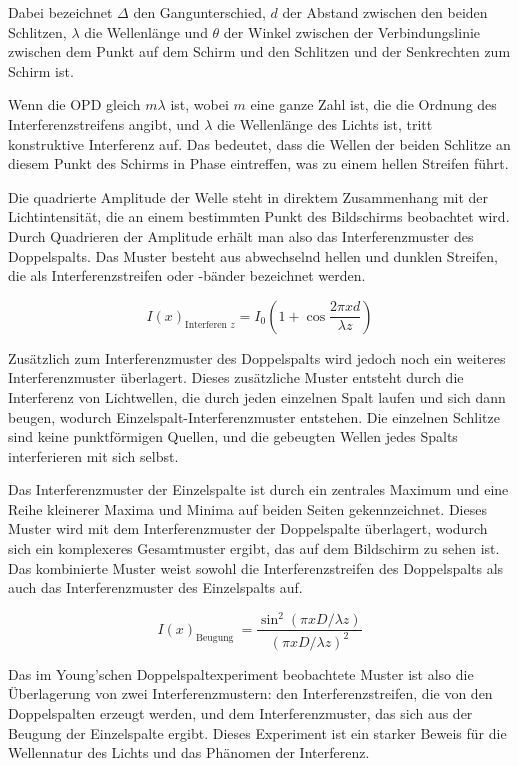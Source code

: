 \documentclass[12pt,english,ngerman]{scrartcl}
\begin{document}

Dabei bezeichnet $\Delta$ den Gangunterschied, $d$ der Abstand zwischen den beiden Schlitzen, $\lambda$ die Wellenlänge
und $\theta$ der Winkel zwischen der
Verbindungslinie zwischen dem Punkt auf dem Schirm und den Schlitzen und der
Senkrechten zum Schirm ist.

Wenn die OPD gleich $m \lambda$ ist, wobei $m$ eine ganze Zahl ist, die die Ordnung des
Interferenzstreifens angibt, und $\lambda$ die Wellenlänge des Lichts ist, tritt
konstruktive Interferenz auf. Das bedeutet, dass die Wellen der beiden Schlitze
an diesem Punkt des Schirms in Phase eintreffen, was zu einem hellen Streifen
führt.

Die quadrierte Amplitude der Welle steht in direktem Zusammenhang mit der
Lichtintensität, die an einem bestimmten Punkt des Bildschirms beobachtet wird.
Durch Quadrieren der Amplitude erhält man also das Interferenzmuster des
Doppelspalts. Das Muster besteht aus abwechselnd hellen und dunklen Streifen,
die als Interferenzstreifen oder -bänder bezeichnet werden.

\begin{equation}
	I(x)_{\text {Interferen } z}=I_0\left(1+\cos \frac{2 \pi x d}{\lambda z}\right)
\end{equation}


Zusätzlich zum Interferenzmuster des Doppelspalts wird jedoch noch ein weiteres
Interferenzmuster überlagert. Dieses zusätzliche Muster entsteht durch die
Interferenz von Lichtwellen, die durch jeden einzelnen Spalt laufen und sich
dann beugen, wodurch Einzelspalt-Interferenzmuster entstehen. Die einzelnen
Schlitze sind keine punktförmigen Quellen, und die gebeugten Wellen jedes
Spalts interferieren mit sich selbst.

Das Interferenzmuster der Einzelspalte ist durch ein zentrales Maximum und eine
Reihe kleinerer Maxima und Minima auf beiden Seiten gekennzeichnet. Dieses
Muster wird mit dem Interferenzmuster der Doppelspalte überlagert, wodurch sich
ein komplexeres Gesamtmuster ergibt, das auf dem Bildschirm zu sehen ist. Das
kombinierte Muster weist sowohl die Interferenzstreifen des Doppelspalts als
auch das Interferenzmuster des Einzelspalts auf.

\begin{equation}
	I(x)_{\text {Beugung }}=\frac{\sin ^2(\pi x D / \lambda z)}{(\pi x D / \lambda z)^2}
\end{equation}

Das im Young'schen Doppelspaltexperiment beobachtete Muster ist also die
Überlagerung von zwei Interferenzmustern: den Interferenzstreifen, die von den
Doppelspalten erzeugt werden, und dem Interferenzmuster, das sich aus der
Beugung der Einzelspalte ergibt. Dieses Experiment ist ein starker Beweis für
die Wellennatur des Lichts und das Phänomen der Interferenz.
\end{document}
